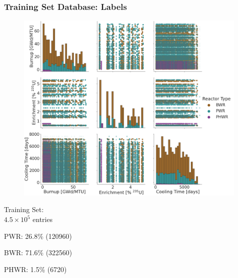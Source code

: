 \begin{frame}
  \frametitle{Training Set Database: Labels}
  \begin{adjustwidth}{-15pt}{-10pt}
  \begin{minipage}{0.8\textwidth}
    \begin{figure}
      \centering
        \includegraphics[height=0.85\textheight]{./figures/histogram_scatter_trainset_viz.png}
    \end{figure}
  \end{minipage}%
  \hfill
  \begin{minipage}{0.27\textwidth}
    \small
    Training Set: \\ $4.5 \times 10^5$ entries
    \begin{itemize}
      \small{
      \item PWR: 26.8\% (120960)
      \item BWR: 71.6\% (322560)
      \item PHWR: 1.5\% (6720)
      }
    \end{itemize}
  \end{minipage}
  \end{adjustwidth}
\end{frame}

